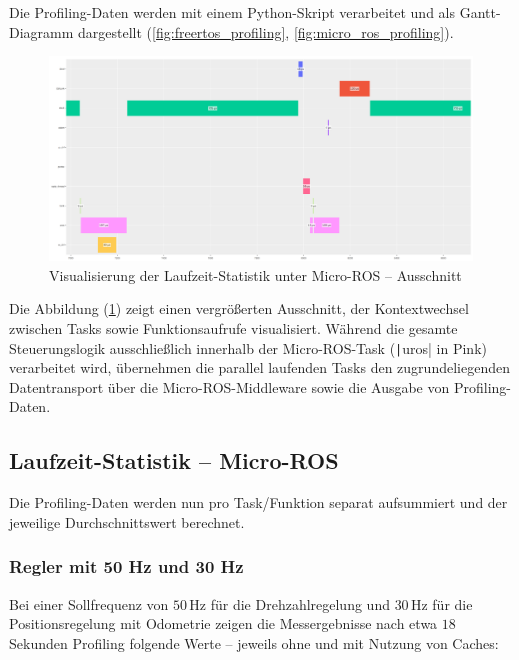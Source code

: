 Die Profiling-Daten werden mit einem Python-Skript verarbeitet und als
Gantt-Diagramm dargestellt (\ref{fig:freertos_profiling},
\ref{fig:micro_ros_profiling}).

\begin{figure}[h]
    \centering
    \includegraphics[width=1\textwidth]{assets/micro_ros_profiling_ausschnitt_cache_enabled}
    \caption{Visualisierung der Laufzeit-Statistik unter Micro-ROS -- Ausschnitt}
    \label{fig:profiling_ausschnitt}
\end{figure}

Die Abbildung (\ref{fig:profiling_ausschnitt}) zeigt einen vergrößerten
Ausschnitt, der Kontextwechsel zwischen Tasks sowie Funktionsaufrufe
visualisiert. Während die gesamte Steuerungslogik ausschließlich innerhalb der
Micro-ROS-Task (\texttt|uros| in Pink) verarbeitet wird, übernehmen
die parallel laufenden Tasks den zugrundeliegenden Datentransport über die
Micro-ROS-Middleware sowie die Ausgabe von Profiling-Daten.

\subsection{Laufzeit-Statistik -- Micro-ROS}

Die Profiling-Daten werden nun pro Task/Funktion separat aufsummiert und der
jeweilige Durchschnittswert berechnet.

\subsubsection{Regler mit 50 Hz und 30 Hz}

Bei einer Sollfrequenz von $50\,\text{Hz}$ für die Drehzahlregelung und
$30\,\text{Hz}$ für die Positionsregelung mit Odometrie zeigen die
Messergebnisse nach etwa $18$ Sekunden Profiling folgende Werte -- jeweils ohne
und mit Nutzung von Caches:

